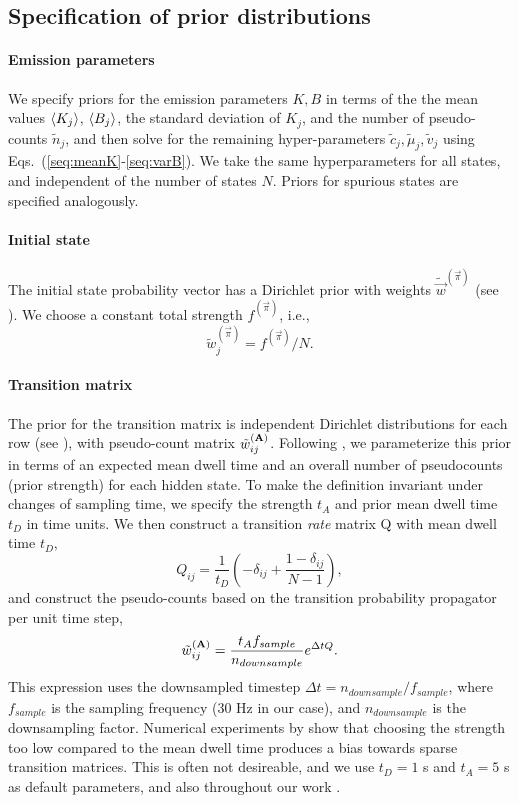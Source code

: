 \subsection{Specification of prior distributions}
\paragraph{Emission parameters}
We specify priors for the emission parameters $K,B$ in terms of the
the mean values $\left\langle K_j\right\rangle$, $\left\langle B_j\right\rangle$, the standard deviation of
$K_j$, and the number of pseudo-counts $\tilde n_j$, and then solve
for the remaining hyper-parameters $\tilde c_j, \tilde \mu_j,\tilde
v_j$ using Eqs.~(\ref{seq:meanK}-\ref{seq:varB}).  We take the same
hyperparameters for all states, and independent of the number of
states $N$. Priors for spurious states are specified analogously.

\paragraph{Initial state}
The initial state probability vector has a Dirichlet prior with
weights $\tilde\vec w^{(\vec{\pi})}$ (see ). We choose a
constant total strength $f^{(\vec\pi)}$, i.e.,
\begin{equation}\label{seq:fPi}
  \tilde w_j^{(\vec{\pi})}=f^{(\vec\pi)}/N.
\end{equation}

\paragraph{Transition matrix}
The prior for the transition matrix is independent Dirichlet
distributions for each row (see ), with pseudo-count
matrix $\tilde w_{ij}^{(\mathbf{A})}$. Following \citet{persson2013},
we parameterize this prior in terms of an expected mean dwell time and
an overall number of pseudocounts (prior strength) for each hidden
state. To make the definition invariant under changes of sampling
time, we specify the strength $t_A$ and prior mean dwell time $t_D$ in
time units. We then construct a transition \textit{rate} matrix Q with
mean dwell time $t_D$,
\begin{equation}\label{seq:Qprior}
  Q_{ij}=\frac{1}{t_D}\left(-\delta_{ij}
  +\frac{1-\delta_{ij}}{N-1}\right),
\end{equation}
and construct the pseudo-counts based on the transition probability
propagator per unit time step,
\begin{equation}\label{seq:wAprior}
  \tilde w_{ij}^{(\mathbf{A})}=\frac{t_Af_{sample}}{n_{downsample}}
  e^{\Delta tQ}.
\end{equation}
This expression uses the downsampled timestep $\Delta
t=n_{downsample}/f_{sample}$, where $f_{sample}$ is the sampling
frequency (30 Hz in our case), and $n_{downsample}$ is the
downsampling factor.  Numerical experiments by \citet{persson2013}
show that choosing the strength too low compared to the mean dwell
time produces a bias towards sparse transition matrices.  This is
often not desireable, and we use $t_D=1$ s and $t_A=5$ s as default
parameters, and also throughout our work \cite{vbTPMpaper}.

